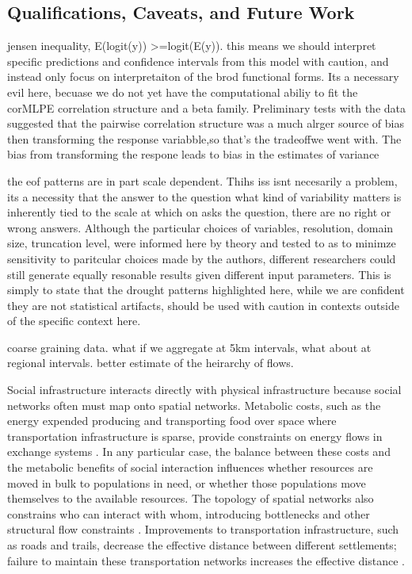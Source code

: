 \documentclass[fleqn,10pt]{wlscirep}
\begin{document}
\subsection*{Qualifications, Caveats, and Future Work}
jensen inequality, E(logit(y)) >=logit(E(y)). this means we should interpret specific predictions and confidence intervals from this model with caution, and instead only focus on interpretaiton of the brod functional forms. Its a necessary evil here, becuase we do not yet have the computational abiliy to fit the corMLPE correlation structure and a beta family. Preliminary tests with the data suggested that the pairwise correlation structure was a much alrger source of bias then transforming the response variabble,so that's the tradeoffwe went with. The bias from transforming the respone leads to bias in the estimates of variance

the eof patterns are in part scale dependent. Thihs iss isnt necesarily a problem, its a necessity that the answer to the question what kind of variability matters is inherently tied to the scale at which on asks the question, there are no right or wrong answers. Although the particular choices of variables, resolution, domain size, truncation level, were informed here by theory and tested to as to minimze sensitivity to paritcular choices made by the authors, different researchers could still generate equally resonable results given  different input parameters.  This is simply to state that the drought patterns highlighted here, while we are confident they are not statistical artifacts, should be used with caution in contexts outside of the specific context here.

coarse graining data. what if we aggregate at 5km intervals, what about at regional intervals. better estimate of the heirarchy of flows.

Social infrastructure interacts directly with physical infrastructure because social networks often must map onto spatial networks. Metabolic costs, such as the energy expended producing and transporting food over space where transportation infrastructure is sparse, provide constraints on energy flows in exchange systems \cite{Drennan1984}. In any particular case, the balance between these costs and the metabolic benefits of social interaction influences whether resources are moved in bulk to populations in need, or whether those populations move themselves to the available resources. The topology of spatial networks also constrains who can interact with whom, introducing bottlenecks and other structural flow constraints \cite{Barthelemy2011SpatialNetworks}. Improvements to transportation infrastructure, such as roads and trails, decrease the effective distance between different settlements; failure to maintain these transportation networks increases the effective distance \cite{McCall1985TheAfrica}.
\end{document}
